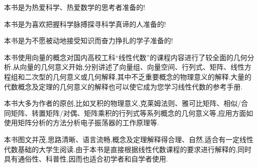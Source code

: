 \documentclass[12pt]{article}
\renewcommand{\,}{\ \text{,}}
\renewcommand{\.}{\ \text{.}}
\begin{document}
本书是为热爱科学、热爱数学的思考者准备的!

本书是为喜欢把握科学脉搏探寻科学真谛的人准备的!

本书是为不愿被动地接受知识而奋力挣扎的学子准备的!

本书使用向量的概念对国内高校工科“线性代数”的课程内容进行了较全面的几何分析.从向量的几何意义开始,分别讲述了向量组、向量空间、行列式、矩阵、线性方程组和二次型的几何意义或几何解释,其中不乏重要概念的物理意义的解释.大量的代数概念及定理的几何意义的解释也可以使它成为您学习线性代数的参考手册.

本书大多为作者的原创,比如叉积的物理意义,克莱姆法则、雅可比矩阵、相似/合同矩阵、转置矩阵/对偶、矩阵乘积的行列式等系列概念的几何意义等,应用方面如使用矩阵分析的方法分析电子振荡器的工作原理等.

本书图文并茂,思路清晰、语言流畅,概念及定理解释得合理、自然,适合有一定线性代数基础的大学生阅读.由于本书是直接根据线性代数课程的要求进行解释的,同时具有通俗性、科普性,因而也适合初学者和自学者使用.
\end{document}
